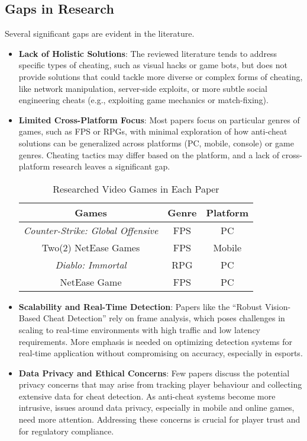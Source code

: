 \documentclass[a4paper, 12pt]{article}
\begin{document}
\subsection{Gaps in Research}

Several significant gaps are evident in the literature.

\begin{itemize}
    \item \textbf{Lack of Holistic Solutions}: The reviewed literature tends to address specific types of cheating, such as visual hacks or game bots, but does not provide solutions that could tackle more diverse or complex forms of cheating, like network manipulation, server-side exploits, or more subtle social engineering cheats (e.g., exploiting game mechanics or match-fixing).
    \item \textbf{Limited Cross-Platform Focus}: Most papers focus on particular genres of games, such as FPS or RPGs, with minimal exploration of how anti-cheat solutions can be generalized across platforms (PC, mobile, console) or game genres. Cheating tactics may differ based on the platform, and a lack of cross-platform research leaves a significant gap.

    \begin{table}[ht]
        \centering
        \begin{tabular}{ccc}
            \hline
            \textbf{Games} & \textbf{Genre} & \textbf{Platform} \\
            \hline
            \textit{Counter-Strike: Global Offensive} & FPS & PC \\
            Two(2) NetEase Games & FPS & Mobile \\
            \textit{Diablo: Immortal} & RPG & PC \\
            NetEase Game & FPS & PC \\
            \hline
        \end{tabular}
        \caption{Researched Video Games in Each Paper}
        \label{tab:game_label}
    \end{table}
    
    \item \textbf{Scalability and Real-Time Detection}: Papers like the “Robust Vision-Based Cheat Detection” rely on frame analysis, which poses challenges in scaling to real-time environments with high traffic and low latency requirements. More emphasis is needed on optimizing detection systems for real-time application without compromising on accuracy, especially in esports.
    \item \textbf{Data Privacy and Ethical Concerns}: Few papers discuss the potential privacy concerns that may arise from tracking player behaviour and collecting extensive data for cheat detection. As anti-cheat systems become more intrusive, issues around data privacy, especially in mobile and online games, need more attention. Addressing these concerns is crucial for player trust and for regulatory compliance.
\end{itemize}
    
\end{document}
